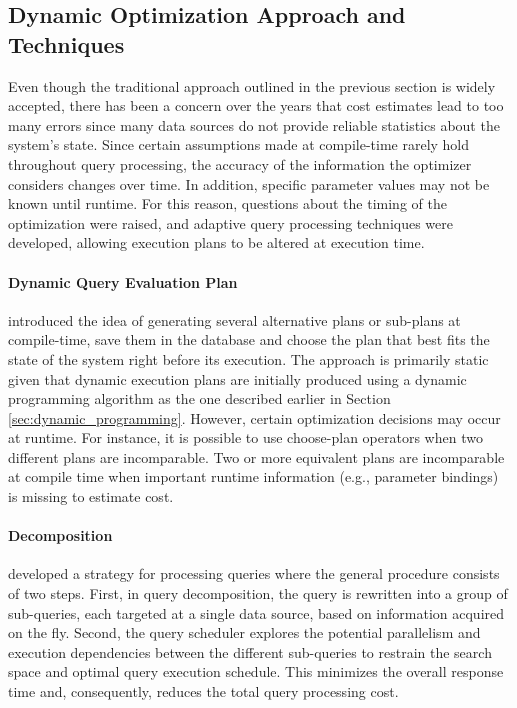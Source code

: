 \subsection{Dynamic Optimization Approach and Techniques}
\label{sec:dynamic_optimization_approach}

Even though the traditional approach outlined in the previous section is widely accepted, there has been a concern over the years that cost estimates lead to too many errors since many data sources do not provide reliable statistics about the system's state. Since certain assumptions made at compile-time rarely hold throughout query processing, the accuracy of the information the optimizer considers changes over time. In addition, specific parameter values may not be known until runtime. For this reason, questions about the timing of the optimization were raised, and adaptive query processing techniques were developed, allowing execution plans to be altered at execution time.

\paragraph{Dynamic Query Evaluation Plan}

\citep{Cole1994} introduced the idea of generating several alternative plans or sub-plans at compile-time, save them in the database and choose the plan that best fits the state of the system right before its execution. The approach is primarily static given that dynamic execution plans are initially produced using a dynamic programming algorithm as the one described earlier in Section \ref{sec:dynamic_programming}. However, certain optimization decisions may occur at runtime. For instance, it is possible to use choose-plan operators when two different plans are incomparable. Two or more equivalent plans are incomparable at compile time when important runtime information (e.g., parameter bindings) is missing to estimate cost.

\paragraph{Decomposition}

\citep{Ozcan1997} developed a strategy for processing queries where the general procedure consists of two steps. First, in query decomposition, the query is rewritten into a group of sub-queries, each targeted at a single data source, based on information acquired on the fly. Second, the query scheduler explores the potential parallelism and execution dependencies between the different sub-queries to restrain the search space and optimal query execution schedule. This minimizes the overall response time and, consequently, reduces the total query processing cost.

